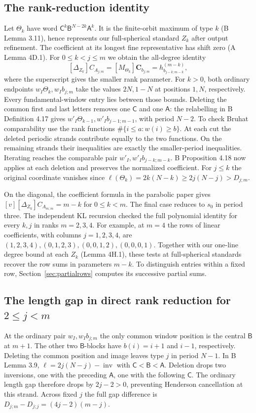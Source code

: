 \subsection*{The rank-reduction identity}
Let \(\Theta_k\) have word \(\mathsf C^k\mathsf B^{N-2k}\mathsf A^k\).
It is the finite-orbit maximum of type \(k\) (B Lemma 3.11), hence represents
our full-spherical standard \(Z_k\) after output refinement. The coefficient
at its longest fine representative has shift zero (A Lemma 4D.1).
For \(0\le k<j\le m\) we obtain the all-degree identity
\[
   [\Delta_{Z_k}]C_{A_{j;m}}
   =[M_{\Theta_k}]\mathbf C_{b_{j;m}}
   =h^{(m-k)}_{b_{j-k;m-k}},
\]
where the superscript gives the smaller rank parameter.
For \(k>0\), both ordinary endpoints \(w_I\Theta_k,w_Ib_{j;m}\) take
the values \(2N,1-N\) at positions \(1,N\), respectively. Every
fundamental-window entry lies between those bounds. Deleting the common
first and last letters removes one \(\mathsf C\) and one \(\mathsf A\):
the relabelling in B Definition 4.17 gives
\(w'_I\Theta_{k-1},w'_I b_{j-1;m-1}\), with period \(N-2\).
To check Bruhat comparability use the rank functions
\(\#\{i\le a:w(i)\ge b\}\).
At each cut the deleted periodic strands contribute equally to the
two functions. On the remaining strands their inequalities are exactly
the smaller-period inequalities. Iterating reaches the comparable pair
\(w'_I,w'_I b_{j-k;m-k}\). B Proposition 4.18 now applies at each
deletion and preserves the normalized coefficient. For \(j\le k\) the
original coordinate vanishes since
\(\ell(\Theta_k)=2k(N-k)\ge 2j(N-j)>D_{j;m}\).

On the diagonal, the coefficient formula in the parabolic paper gives \([v][\Delta_{Z_k}] C_{A_{m;m}}=m-k\) for
\(0\le k<m\). The final case reduces to \(s_0\) in period three.
The independent KL recursion checked the full polynomial identity for every
\(k,j\) in ranks \(m=2,3,4\). For example, at \(m=4\) the rows of
linear coefficients, with columns \(j=1,2,3,4\), are
\((1,2,3,4),(0,1,2,3),(0,0,1,2),(0,0,0,1)\).
Together with our one-line degree bound at each \(Z_k\) (Lemma 4H.1),
these tests at full-spherical standards recover the row sums in
parameters \(m-k\). To distinguish entries within a fixed row,
Section~\ref{sec:partialrows} computes its successive partial sums.

\subsection*{The length gap in direct rank reduction for \(2\le j<m\)}
At the ordinary pair \(w_I,w_Ib_{j;m}\) the only common window
position is the central \(\mathsf B\) at \(m+1\). The other two
\(\mathsf B\)-blocks have \(b(i)=i+1\) and \(i-1\), respectively.
Deleting the common position and image leaves type \(j\) in period
\(N-1\). In B Lemma 3.9, \(\ell=2j(N-j)-\operatorname{inv}\) with
\(\mathsf C<\mathsf B<\mathsf A\). Deletion drops two inversions, one
with the preceding \(\mathsf A\), one with the following \(\mathsf C\).
The ordinary length gap therefore drops by \(2j-2>0\), preventing
Henderson cancellation at this strand. Across fixed \(j\) the full gap
difference is \(D_{j;m}-D_{j;j}=(4j-2)(m-j)\).

